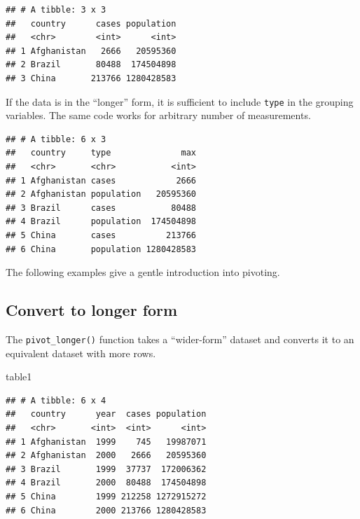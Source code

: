 \documentclass[]{book}
\newenvironment{Shaded}{}{}
\newcommand{\DataTypeTok}[1]{#1}
\newcommand{\KeywordTok}[1]{\textcolor[rgb]{0.00,0.00,1.00}{#1}}
\newcommand{\NormalTok}[1]{#1}
\newcommand{\OperatorTok}[1]{#1}
\newcommand{\StringTok}[1]{\textcolor[rgb]{0.00,0.50,0.50}{#1}}
\begin{document}
\begin{verbatim}
## # A tibble: 3 x 3
##   country      cases population
##   <chr>        <int>      <int>
## 1 Afghanistan   2666   20595360
## 2 Brazil       80488  174504898
## 3 China       213766 1280428583
\end{verbatim}

If the data is in the ``longer'' form, it is sufficient to include \texttt{type} in the grouping variables.
The same code works for arbitrary number of measurements.

\begin{Shaded}
\end{Shaded}

\begin{verbatim}
## # A tibble: 6 x 3
##   country     type              max
##   <chr>       <chr>           <int>
## 1 Afghanistan cases            2666
## 2 Afghanistan population   20595360
## 3 Brazil      cases           80488
## 4 Brazil      population  174504898
## 5 China       cases          213766
## 6 China       population 1280428583
\end{verbatim}

The following examples give a gentle introduction into pivoting.

\hypertarget{convert-to-longer-form}{%
\subsection{Convert to longer form}\label{convert-to-longer-form}}

The \texttt{pivot\_longer()} function takes a ``wider-form'' dataset and converts it to an equivalent dataset with more rows.

\begin{Shaded}
\begin{Highlighting}[]
\NormalTok{table1}
\end{Highlighting}
\end{Shaded}

\begin{verbatim}
## # A tibble: 6 x 4
##   country      year  cases population
##   <chr>       <int>  <int>      <int>
## 1 Afghanistan  1999    745   19987071
## 2 Afghanistan  2000   2666   20595360
## 3 Brazil       1999  37737  172006362
## 4 Brazil       2000  80488  174504898
## 5 China        1999 212258 1272915272
## 6 China        2000 213766 1280428583
\end{verbatim}
\end{document}
